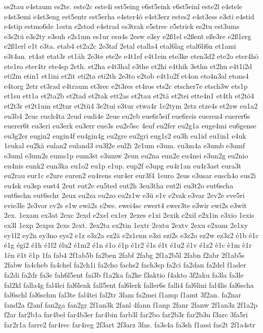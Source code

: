 {es2tau
e4staum
es2te.
este2c
este4i
est5eing
e6st5eink
e6st5einl
este2l
e4stele
e4st3emi
e4st3eng
est5entr
est5erha
e4ster4ö
e4st3erz
estes2
e4st3ess
e3sti
e4stid
e4stip
estmo6de
1estn
e2stod
e4strad
es3trak
e5strec
e5strick
es2tu
est3ums
e3s2tü
e3s2ty
e3suh
e2s1um
es1ur
esu4s
2esw
e3sy
e2ß1el
e2ßent
eße3re
e2ß1erg
e2ß1erl
e1t
e3ta.
etab4
et2a2c
2e3taf
2etal
etalla4
etal6lag
etal6li6n
et1ami
e3t4an.
et4at
etat3r
et1äh
2e3te
ete2e
e4t1ef
e4t1ein
ete3ke
eten3d2
ete2o
eter4hö
ete1ro
eter4tr
ete4sp
2eth.
et2ha
e4t3hal
e3the
et2hi
e4thik
3ethn
et2hu
e4t1i2d
eti2m
etin1
et1ini
et2it
eti2ta
eti2th
2e3to
e2tob
e4t1o2f
et4on
eto4n3al
etons4
e4torg
2etr
et3rad
e4traum
et3rec
e2t3res
et4ros
ets2c
etscher7e
etsch3w
ets1p
et1su
ett1a
et2ta2b
et2tad
et2tak
ett2as
et2tau
et2tä
et2tei
ette4n1
et4th
et2tö4
et2t3r
et2t1um
et2tur
et2tü4
3e2tui
e3tur
etwa4r
1e2tym
2etz
etze4s
et2zw
eu1a2
eu3b4
2euc
euch4ta
2eud
eudi4e
2eue
eu2eb
eue6r5eif
eue6reis
eueren4
euerer6s
euerer6t
eu3eri
eu3erk
eu3err
eue3s
eu2e5sc
4euf
eu2fer
eu2g1a
euge4mi
eu6gense
eu3g2er
eugin2
eugin4f
eu4gin4g
eu2gre
eu2gri
eug1s2
eu3h
eu1id
eu1in1
e4uk
1eukal
eu2kä
eulan2
euland3
eu3l2e
eul2i
2e1um
e3um.
eu3m4a
e3umb
e3umf
e3uml
e3um2s
eums1p
eum3st
e3umw
2eun
eu2na
eun2e
eu4nei
e3un2g
eu2nio
eu4nis
eunk2
eun3ka
eu1o2
eu1p
e1up.
eup2f
e3upg
eu4r1an
eu4r3ast
eura3t
eu2rau
eur1c
e2ure
euren2
eu4rens
eur4er
eur3f4
1euro
2eus
e3usar
eusch4o
eus2i
eu4sk
eu3sp
eust4
2eut
eut2e
eu5ted
eut2h
3eu3tha
eut2i
eu3t2o
eut6scha
eut6schn
eut6schr
2eux
eu2za
eu2zo
eu2z1w
e3ü
e1v
e2vak
e3var
2ev2e
eve5ri
evie3le
2e3vor
ev2s
e1w
ewä2s
e2we.
ewei4sc
ewert4
ewer3te
e3wir
ewi2s
e3wit
2ex.
1exam
ex3at
2exc
2exd
e2xel
ex1er
2exes
e1xi
2exik
e2xil
e2x1in
e3xio
1exis
ex3l
1exp
2expu
2exs
2ext.
2ex2ta
ex2tin
1extr
2extu
2extv
2exu
e2xum
2e1xy
ey1l2
ey2n
ey3no
eys2
e1z
e3z2a
ez2ä
e2z1enn
e3zi
ezi2s
e3z2o
ez2w
ez3z2
é1b
é1c
é1g
égi2
é1h
é1l2
élu2
é1m2
é1n
é1o
é1p
é1r2
é1s
é1t
é1u2
é1v
é1z2
è1c
è1m
è1r
1ën
ë1t
ê1p
1fa
fab4
2f1ab5b
fa2ben
2fabf
2fabg
2f1a2b5l
2fabn
f2abr
2f1ab5s
2fabw
fa4cheb
fa4chel
fa2ch1i
fa2cho
fachs2
fach3sp
fa2ci
fa2dan
fa2del
f1ader
fa2di
fa2dr
fa3e
fah6l5ent
fai3b
f1a2ka
fa2ke
f3aktio
f4akto
3f2aku
fa3la
fa3le
fal2kl
falla4g
fal4lei
fal6lenk
fall5ent
fal6lerk
faller6s
falli4
fal6lini
fal4lis
fal6scha
fal6schl
fal6schm
fal3te
fal4tei
fal2tr
3fam
fa2mei
f1amp
f1amt
3f2an.
fa2nar
fand2a
f2anf
fan2ga
fan2gr
2f1an3k
2fanl
4fann
f1anp
2fanr
2fanw
2f1an3z
2f1a2p
f2ar
far2b1a
far4bel
far4b3er
far4bin
farb3l
far2bo
far2b3r
far2b3u
f3arc
3fa5ri
far2r1a
farre2
far4rec
far4reg
2f3art
2f3arz
3fas.
fa3s4a
fa3sh
f1assi
fas2t
2f1a4str
}
